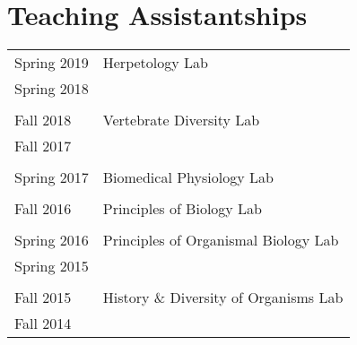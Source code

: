 \section*{Teaching Assistantships}


\begin{tabular}{ l l }
    Spring 2019 & Herpetology Lab \\ 
    Spring 2018 &  \\
    
    & \\
    
    Fall 2018  & Vertebrate Diversity Lab \\
    Fall 2017 & \\
    
    & \\
    
    Spring 2017 & Biomedical Physiology Lab \\
    
    & \\
    
    Fall 2016 & Principles of Biology Lab \\
    
    & \\
    
    Spring 2016   & Principles of Organismal Biology Lab \\
    Spring 2015 & \\
    
    & \\
    
    Fall 2015 & History \& Diversity of Organisms Lab \\
    Fall 2014 & \\
    
\end{tabular}
